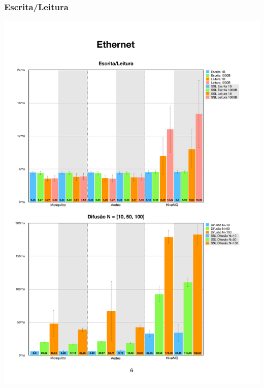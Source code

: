 \documentclass[12pt,a4paper]{article}
\begin{document}
\subsubsection{Escrita/Leitura}
\begin{center}
\includegraphics[width=1.0\textwidth]{eth_wr.pdf}
\end{center}
\end{document}

